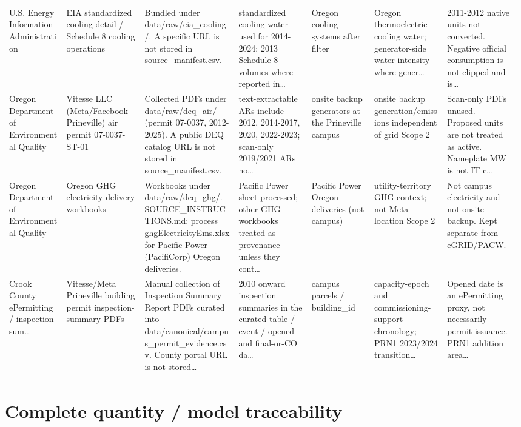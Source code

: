 \documentclass[11pt]{article}
\begin{document}
\begin{longtable}{@{}p{0.11\linewidth}p{0.15\linewidth}p{0.18\linewidth}p{0.14\linewidth}p{0.12\linewidth}p{0.14\linewidth}p{0.14\linewidth}@{}}
U.S. Energy Information Administration & EIA standardized cooling-detail / Schedule 8 cooling operations & Bundled under data/raw/eia\_cooling/. A specific URL is not stored in source\_manifest.csv. & standardized cooling water used for 2014-2024; 2013 Schedule 8 volumes where reported in\ldots & Oregon cooling systems after filter & Oregon thermoelectric cooling water; generator-side water intensity where gener\ldots & 2011-2012 native units not converted. Negative official consumption is not clipped and is\ldots\\
Oregon Department of Environmental Quality & Vitesse LLC (Meta/Facebook Prineville) air permit 07-0037-ST-01 & Collected PDFs under data/raw/deq\_air/ (permit 07-0037, 2012-2025). A public DEQ catalog URL is not stored in source\_manifest.csv. & text-extractable ARs include 2012, 2014-2017, 2020, 2022-2023; scan-only 2019/2021 ARs no\ldots & onsite backup generators at the Prineville campus & onsite backup generation/emissions independent of grid Scope 2 & Scan-only PDFs unused. Proposed units are not treated as active. Nameplate MW is not IT c\ldots\\
Oregon Department of Environmental Quality & Oregon GHG electricity-delivery workbooks & Workbooks under data/raw/deq\_ghg/. SOURCE\_INSTRUCTIONS.md: process ghgElectricityEms.xlsx for Pacific Power (PacifiCorp) Oregon deliveries. & Pacific Power sheet processed; other GHG workbooks treated as provenance unless they cont\ldots & Pacific Power Oregon deliveries (not campus) & utility-territory GHG context; not Meta location Scope 2 & Not campus electricity and not onsite backup. Kept separate from eGRID/PACW.\\
Crook County ePermitting / inspection sum\ldots & Vitesse/Meta Prineville building permit inspection-summary PDFs & Manual collection of Inspection Summary Report PDFs curated into data/canonical/campus\_permit\_evidence.csv. County portal URL is not stored\ldots & 2010 onward inspection summaries in the curated table / event / opened and final-or-CO da\ldots & campus parcels / building\_id & capacity-epoch and commissioning-support chronology; PRN1 2023/2024 transition\ldots & Opened date is an ePermitting proxy, not necessarily permit issuance. PRN1 addition area\ldots\\
\end{longtable}
\endgroup

\section{Complete quantity / model traceability}
\label{app:quantities}
\end{document}
